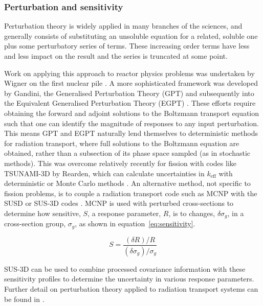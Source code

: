\FloatBarrier
\subsubsection{Perturbation and sensitivity}
\label{subsubsec:pert}
Perturbation theory is widely applied in many branches of the sciences, and generally consists of substituting an unsoluble equation for a related, soluble one plus some perturbatory series of terms. These increasing order terms have less and less impact on the result and the series is truncated at some point. 

Work on applying this approach to reactor physics problems was undertaken by Wigner on the first nuclear pile \cite{Rising2012}. A more sophisticated framework was developed by Gandini, the Generalised Perturbation Theory (GPT) \cite{Gandini1967} and subsequently into the Equivalent Generalised Perturbation Theory (EGPT) \cite{Gandini1986}. These efforts require obtaining the forward and adjoint solutions to the Boltzmann transport equation such that one can identify the magnitude of responses to any input perturbation. This means GPT and EGPT naturally lend themselves to deterministic methods for radiation transport, where full solutions to the Boltzmann equation are obtained, rather than a subsection of its phase space sampled (as in stochastic methods). This was overcome relatively recently for fission with codes like TSUNAMI-3D by Rearden, which can calculate uncertainties in $k_{\mathrm{eff}}$ with deterministic or Monte Carlo methods \cite{Rearden2004}. An alternative method, not specific to fission problems, is to couple a radiation transport code such as MCNP \cite{goorley2012} with the SUSD or SUS-3D codes \cite{Kodeli2001}. MCNP is used with perturbed cross-sections to determine how sensitive, $S$, a response parameter, $R$, is to changes, $\delta \sigma_{g}$, in a cross-section group, $\sigma_{g}$, as shown in equation~\ref{eq:sensitivity}. 

\begin{equation}
  \label{eq:sensitivity}
  S = \frac{(\delta R)/R}{(\delta \sigma_{g}) / \sigma_{g}}
\end{equation}

SUS-3D can be used to combine processed covariance information with these sensitivity profiles to determine the uncertainty in various response parameters. Further detail on perturbation theory applied to radiation transport systems can be found in \cite{Sabouri2013}.

